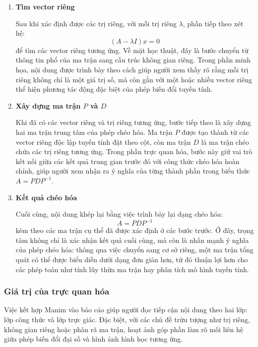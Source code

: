 \documentclass[12pt,a4paper]{article}
\begin{document}
\begin{enumerate}[label=\textbf{\alph*) Bước \arabic*:}, leftmargin=*, align=left]
\item \textbf{Tìm vector riêng}

Sau khi xác định được các trị riêng, với mỗi trị riêng $\lambda$, phần tiếp theo xét hệ:
\begin{equation}
(A - \lambda I)x = 0
\end{equation}
để tìm các vector riêng tương ứng. Về mặt học thuật, đây là bước chuyển từ thông tin phổ của ma trận sang cấu trúc không gian riêng. Trong phần minh họa, nội dung được trình bày theo cách giúp người xem thấy rõ rằng mỗi trị riêng không chỉ là một giá trị số, mà còn gắn với một hoặc nhiều vector riêng thể hiện phương tác động đặc biệt của phép biến đổi tuyến tính.

\item \textbf{Xây dựng ma trận $P$ và $D$}

Khi đã có các vector riêng và trị riêng tương ứng, bước tiếp theo là xây dựng hai ma trận trung tâm của phép chéo hóa. Ma trận $P$ được tạo thành từ các vector riêng độc lập tuyến tính đặt theo cột, còn ma trận $D$ là ma trận chéo chứa các trị riêng tương ứng. Trong phần trực quan hóa, bước này giữ vai trò kết nối giữa các kết quả trung gian trước đó với công thức chéo hóa hoàn chỉnh, giúp người xem nhận ra ý nghĩa của từng thành phần trong biểu thức $A = P D P^{-1}$.

\item \textbf{Kết quả chéo hóa}

Cuối cùng, nội dung khép lại bằng việc trình bày lại dạng chéo hóa:
\begin{equation}
A = P D P^{-1}
\end{equation}
kèm theo các ma trận cụ thể đã được xác định ở các bước trước. Ở đây, trọng tâm không chỉ là xác nhận kết quả cuối cùng, mà còn là nhấn mạnh ý nghĩa của phép chéo hóa: thông qua việc chuyển sang cơ sở riêng, một ma trận tổng quát có thể được biểu diễn dưới dạng đơn giản hơn, từ đó thuận lợi hơn cho các phép toán như tính lũy thừa ma trận hay phân tích mô hình tuyến tính.

\end{enumerate}

\subsubsection{Giá trị của trực quan hóa}
Việc kết hợp Manim vào báo cáo giúp người đọc tiếp cận nội dung theo hai lớp: lớp công thức và lớp trực giác. Đặc biệt, với các chủ đề trừu tượng như trị riêng, không gian riêng hoặc phân rã ma trận, hoạt ảnh góp phần làm rõ mối liên hệ giữa phép biến đổi đại số và hình ảnh hình học tương ứng.\cite{ref7}
\end{document}
